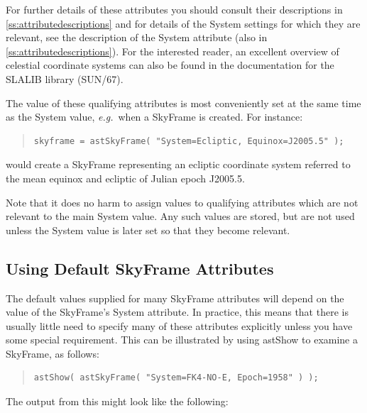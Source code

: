 \documentclass[twoside,11pt]{article}
\newcommand{\htmlref}[2]{#1}
\newcommand{\xref}[3]{#1}
\newcommand{\appref}[1]{Appendix~\ref{#1}}
\renewcommand{\appref}[1]{\ref{#1}}
\begin{document}
For further details of these attributes you should consult their
descriptions in \appref{ss:attributedescriptions} and for details of
the System settings for which they are relevant, see the description
of the System attribute (also in \appref{ss:attributedescriptions}).
For the interested reader, an excellent overview of celestial
coordinate systems can also be found in the documentation for the
SLALIB library (\xref{SUN/67}{sun67}{}).

The value of these qualifying attributes is most conveniently set at
the same time as the System value, {\em{e.g.}}\ when a SkyFrame is
created. For instance:

\begin{quote}
\small
\begin{verbatim}
skyframe = astSkyFrame( "System=Ecliptic, Equinox=J2005.5" );
\end{verbatim}
\normalsize
\end{quote}

would create a SkyFrame representing an ecliptic coordinate system
referred to the mean equinox and ecliptic of Julian epoch J2005.5.

Note that it does no harm to assign values to qualifying attributes
which are not relevant to the main System value. Any such values are
stored, but are not used unless the System value is later set so that
they become relevant.

\subsection{Using Default SkyFrame Attributes}

The default values supplied for many \htmlref{SkyFrame}{SkyFrame} attributes will depend
on the value of the SkyFrame's \htmlref{System}{System} attribute. In practice, this
means that there is usually little need to specify many of these
attributes explicitly unless you have some special requirement. This
can be illustrated by using \htmlref{astShow}{astShow} to examine a SkyFrame, as follows:

\begin{quote}
\small
\begin{verbatim}
astShow( astSkyFrame( "System=FK4-NO-E, Epoch=1958" ) );
\end{verbatim}
\normalsize
\end{quote}

The output from this might look like the following:
\end{document}
